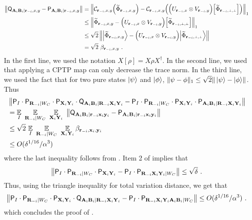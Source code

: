 \begin{align*}
	\left \| \Qsf_{\bA_i \bB_i | \br_\mi, x,y} - \P_{\bA_i \bB_i | \br_\mi,x,y}\right \| &= \left \| \mathcal{C}_{\br_\mi,x,y} \Big ( \wt{\Phi}_{\br_\mi,x,y} \Big) - \mathcal{C}_{\br_\mi,x,y} \Big ( \Big (   U_{\br_\mi,x} \otimes V_{\br_\mi,y} \Big) \Big [\wt{\Phi}_{\sspp} \Big ]\Big) \right \|_1 \\
	&\leq  \left \|  \wt{\Phi}_{\br_\mi,x,y}  -  \Big (   U_{\br_\mi,x} \otimes V_{\br_\mi,y} \Big) \Big [\wt{\Phi}_{\sspp} \Big ] \right \|_1 \\
	&\leq \sqrt{2} \left \| \bigket{\wt{\Phi}_{\br_\mi,x,y}}  -  \Big (   U_{\br_\mi,x} \otimes V_{\br_\mi,y} \Big) \bigket{\wt{\Phi}_{\sspp}} \right \| \\
	&= \sqrt{2} \,\, \beta_{\br_\mi,x,y}~.
\end{align*}
In the first line, we used the notation $X[\rho] = X \rho X^\dagger$. In the second line, we used that applying a CPTP map can only decrease the trace norm. In the third line, we used the fact that for two pure states ${|\psi\rangle}$ and ${|\phi\rangle}$, $ \| \psi - \phi \|_1 \leq \sqrt{2} \|\, {|\psi\rangle} - {|\phi\rangle} \|$. 
%
Thus
\begin{align*}
	&\left \| \mathsf{P}_I \cdot \mathsf{P}_{\mathbf{R}_{-i} |W_C} \cdot \mathsf{P}_{\mathbf{X}_i \mathbf{Y}_i} \cdot \mathsf{Q}_{\mathbf{A}_i \mathbf{B}_i |\mathbf{R}_{-i} \mathbf{X}_i \mathbf{Y}_i } 
	- \mathsf{P}_I \cdot \mathsf{P}_{\mathbf{R}_{-i} |W_C} \cdot \mathsf{P}_{\mathbf{X}_i \mathbf{Y}_i} \cdot \mathsf{P}_{\mathbf{A}_i \mathbf{B}_i | \mathbf{R}_{-i} \mathbf{X}_i \mathbf{Y}_i} \right \|  \\
	&= \operatorname*{\mathbb{E}}_I \, \, \operatorname*{\mathbb{E}}_{\mathbf{R}_{-i} |W_C} \,\, \operatorname*{\mathbb{E}}_{\mathbf{X}_i \mathbf{Y}_i} \,\, \left \| \mathsf{Q}_{\mathbf{A}_i \mathbf{B}_i |\mathbf{r}_{-i} \mathbf{x}_i \mathbf{y}_i} - \mathsf{P}_{\mathbf{A}_i \mathbf{B}_i | \mathbf{r}_{-i} \mathbf{x}_i \mathbf{y}_i} \right \|    \\
	&\leq \sqrt{2} \, \operatorname*{\mathbb{E}}_I \, \, \operatorname*{\mathbb{E}}_{\mathbf{R}_{-i} |W_C} \,\, \operatorname*{\mathbb{E}}_{\mathbf{X}_i \mathbf{Y}_i} \beta_{\mathbf{r}_{-i},\mathbf{x}_i,\mathbf{y}_i} \\
	&\leq O(\delta^{1/16}/\alpha^3)
\end{align*}
where the last inequality follows from . Item 2 of  implies that 
\[
\left \| \mathsf{P}_I \cdot \mathsf{P}_{\mathbf{R}_{-i} |W_C} \cdot \mathsf{P}_{\mathbf{X}_i \mathbf{Y}_i} - \mathsf{P}_I \cdot \mathsf{P}_{\mathbf{R}_{-i} \mathbf{X}_i \mathbf{Y}_i | W_C} \right \| \leq \sqrt{\delta}~.
\] 
Thus, using the triangle inequality for total variation distance, we get that
\[
\left \| \mathsf{P}_I \cdot \mathsf{P}_{\mathbf{R}_{-i} |W_C} \cdot \mathsf{P}_{\mathbf{X}_i \mathbf{Y}_i} \cdot \mathsf{Q}_{\mathbf{A}_i \mathbf{B}_i |\mathbf{R}_{-i} \mathbf{X}_i \mathbf{Y}_i } 
	- \mathsf{P}_I \cdot \mathsf{P}_{\mathbf{R}_{-i} \mathbf{X}_i \mathbf{Y}_i \mathbf{A}_i \mathbf{B}_i |W_C}  \right \| \leq O(\delta^{1/16}/\alpha^3)~.
\]
which concludes the proof of .

